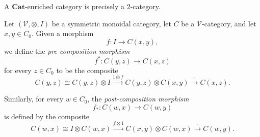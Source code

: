 \documentclass{tac}
\begin{document}
\begin{example}
A $\mathbf{Cat}$-enriched category is precisely a $2$-category.
\end{example}

\begin{notation}
Let $(\mathcal{V},\otimes,I)$ be a symmetric monoidal category, let $C$ be a
$\mathcal{V}$-category, and let $x,y\in C_0$. Given a morphism
\[
f:I\to C(x,y),
\]
we define the \emph{pre-composition morphism}
\[
f^*:C(y,z)\to C(x,z)
\]
for every $z\in C_0$ to be the composite
\[
C(y,z)
\cong
C(y,z)\otimes I
\xrightarrow{1\otimes f}
C(y,z)\otimes C(x,y)
\xrightarrow{\circ}
C(x,z).
\]

Similarly, for every $w\in C_0$, the \emph{post-composition morphism}
\[
f_*:C(w,x)\to C(w,y)
\]
is defined by the composite
\[
C(w,x)
\cong
I\otimes C(w,x)
\xrightarrow{f\otimes1}
C(x,y)\otimes C(w,x)
\xrightarrow{\circ}
C(w,y).
\]
\end{notation}
\end{document}
